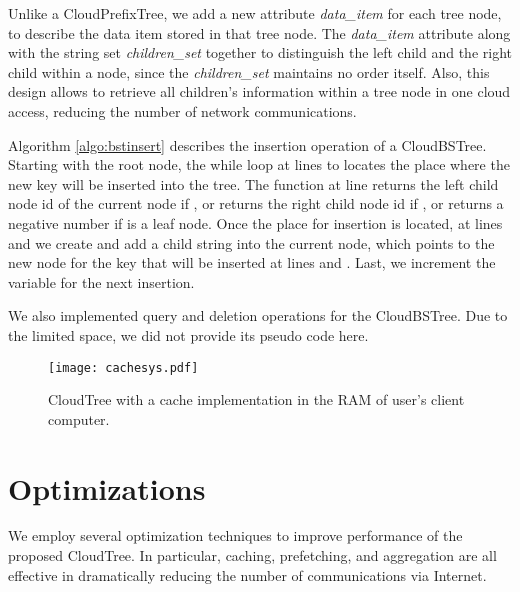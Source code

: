 \documentclass[10pt, conference, compsocconf]{IEEEtran}
\newcommand{\remove}[1]{}
\begin{document}
Unlike a CloudPrefixTree, we add a new attribute \emph{data\_item} for each tree node, 
to describe the data item stored in that tree node. The \emph{data\_item} attribute along with 
the string set \emph{children\_set} together to distinguish the left child and the right child within a node, 
since the \emph{children\_set} maintains no order itself. Also, this design allows to retrieve 
all children's information within a tree node in one cloud access, reducing the
number of network communications. 

\remove{
We present the query algorithm of a CloudBSTree in Algorithm \ref{algo:bstquery}.
Starting with the root node with id = , we compare the key  with the data item  in the current node.
We stop the search if they are equal. Otherwise, we search in the left subtree of the current node if , Or
we search in the right subtree of the current node if . The function  at line 
returns the left child node id of the current node if , or returns the right child node id if , or returns
a negative number if  is a leaf node.
}

Algorithm \ref{algo:bstinsert} describes the insertion operation of a CloudBSTree.
Starting with the root node, the while loop at lines  to  locates the place where
the new key will be inserted into the tree. 
The function  at line 
returns the left child node id of the current node if , or returns the right child node id if , or returns
a negative number if  is a leaf node.
Once the place for insertion is located, at lines  and  we create and add a child string into 
the current node, which points to the new node for the key  that will be inserted at lines  and .
Last, we increment the variable  for the next insertion.

We also implemented query and deletion operations for the CloudBSTree.
Due to the limited space, we did not provide its pseudo code here.


\begin{figure}[t]
\begin{center}
\texttt{[image: cachesys.pdf]}
\caption{CloudTree with a cache implementation in the RAM of user's client computer.}
\label{fig:cache}
\end{center}
\end{figure}


\section{Optimizations}
\label{optimize}
We employ several optimization techniques to improve performance of the proposed CloudTree.
In particular, caching, prefetching, and aggregation are all effective in dramatically 
reducing the number of communications via Internet.
\end{document}
